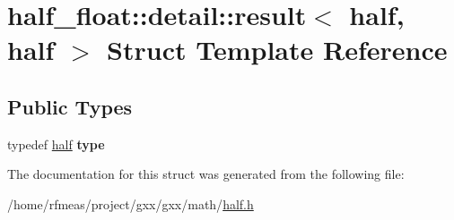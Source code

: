 \hypertarget{structhalf__float_1_1detail_1_1result_3_01half_00_01half_01_4}{}\section{half\+\_\+float\+:\+:detail\+:\+:result$<$ half, half $>$ Struct Template Reference}
\label{structhalf__float_1_1detail_1_1result_3_01half_00_01half_01_4}
\subsection*{Public Types}
\begin{DoxyCompactItemize}
\item 
typedef \hyperlink{classhalf__float_1_1half}{half} {\bfseries type}\hypertarget{structhalf__float_1_1detail_1_1result_3_01half_00_01half_01_4_a355650e21ab1992de1511096e2d9cef3}{}\label{structhalf__float_1_1detail_1_1result_3_01half_00_01half_01_4_a355650e21ab1992de1511096e2d9cef3}

\end{DoxyCompactItemize}


The documentation for this struct was generated from the following file\+:\begin{DoxyCompactItemize}
\item 
/home/rfmeas/project/gxx/gxx/math/\hyperlink{half_8h}{half.\+h}\end{DoxyCompactItemize}
